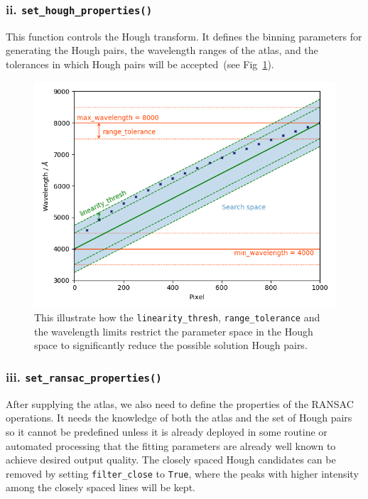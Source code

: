 \documentclass[fleqn,usenatbib]{rasti}
\begin{document}
\subsubsection*{ii. \texttt{set\_hough\_properties()}}
This function controls the Hough transform. It defines the binning parameters for
generating the Hough pairs, the wavelength ranges of the atlas, and the tolerances
in which Hough pairs will be accepted~(see Fig~\ref{fig:threshold}).

\begin{figure}[h]
    \centering
    \includegraphics[width=\columnwidth]{plots/figure_1_threshold_plot.png}
    \caption{This illustrate how the \texttt{linearity\_thresh},
    \texttt{range\_tolerance} and the wavelength limits restrict the parameter
    space in the Hough space to significantly reduce the possible solution Hough
    pairs.}
    \label{fig:threshold}
\end{figure}

\subsubsection*{iii. \texttt{set\_ransac\_properties()}}
After supplying the atlas, we also need to define the properties of the RANSAC
operations. It needs the knowledge of both the atlas and the set of Hough pairs
so it cannot be predefined unless it is already deployed in some routine or
automated processing that the fitting parameters are already well known to
achieve desired output quality. The closely spaced Hough candidates can be
removed by setting \texttt{filter\_close} to \texttt{True}, where the peaks with
higher intensity among the closely spaced lines will be kept.
\end{document}
